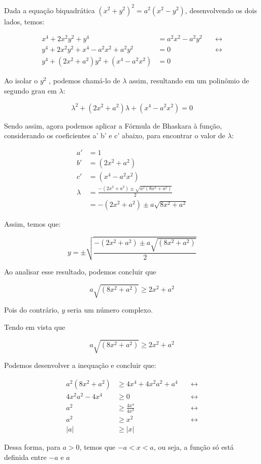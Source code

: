 \documentclass[../resumo.tex]{subfiles}
\begin{document}
	Dada a equação biquadrática $(x^2 + y^2)^2 = a^2(x^2 - y^2)$, desenvolvendo os dois lados,
	temos:

	\begin{align*}
		x^4 + 2x^2y^2 + y^4 &= a^2x^2 - a^2y^2 \quad &\longleftrightarrow \\
		y^4 + 2x^2y^2 + x^4 - a^2x^2 + a^2y^2 &= 0 \quad &\longleftrightarrow \\
		y^4 + (2x^2 + a^2)y^2 + (x^4 - a^2x^2) &= 0
	\end{align*}

	Ao isolar o $y^2$ , podemos chamá-lo de $\lambda$ assim, resultando em um
	polinômio de segundo grau em $\lambda$:

	\[\lambda^2 + (2x^2 + a^2)\lambda + (x^4 - a^2x^2) = 0\]

	Sendo assim, agora podemos aplicar a Fórmula de Bhaskara à função, considerando os coeficientes a' b' e c'
	abaixo,
	para encontrar o valor de $\lambda$:

	\begin{align*}
		a' &= 1 \\
		b' &= (2x^2 + a^2) \\
		c' &= (x^4 - a^2x^2) \\
		\lambda &= \frac{-(2x^2 + a^2) \pm \sqrt{a^2(8x^2 + a^2)}}{2} \\
		&= -(2x^2 + a^2) \pm a\sqrt{8x^2 + a^2}
	\end{align*}

	Assim, temos que:

	\[y = \pm \sqrt{\frac{-(2x^2 + a^2) \pm a\sqrt{(8x^2 + a^2)}}{2}}\]

	Ao analisar esse resultado, podemos concluir que

	\[a\sqrt{(8x^2 + a^2)} \geq 2x^2 + a^2\]

	Pois do contrário, $y$ seria um número complexo.

	Tendo em vista que

	\[a\sqrt{(8x^2 + a^2)} \geq 2x^2 + a^2\]

	Podemos desenvolver a inequação e concluir que:

	\begin{align*}
		a^2(8x^2 + a^2) &\geq 4x^4 + 4x^2a^2 + a^4 \quad &\longleftrightarrow \\
		4x^2a^2 - 4x^4 &\geq 0 \quad &\longleftrightarrow \\
		a^2 &\geq \frac{4x^4}{4x^2} \quad &\longleftrightarrow \\
		a^2 &\geq x^2 \quad &\longleftrightarrow \\
		|a| &\geq |x|
	\end{align*}

	Dessa forma, para $a > 0$, temos que $-a < x < a$, ou seja, a função só
	está definida entre $-a$ e $a$
\end{document}
